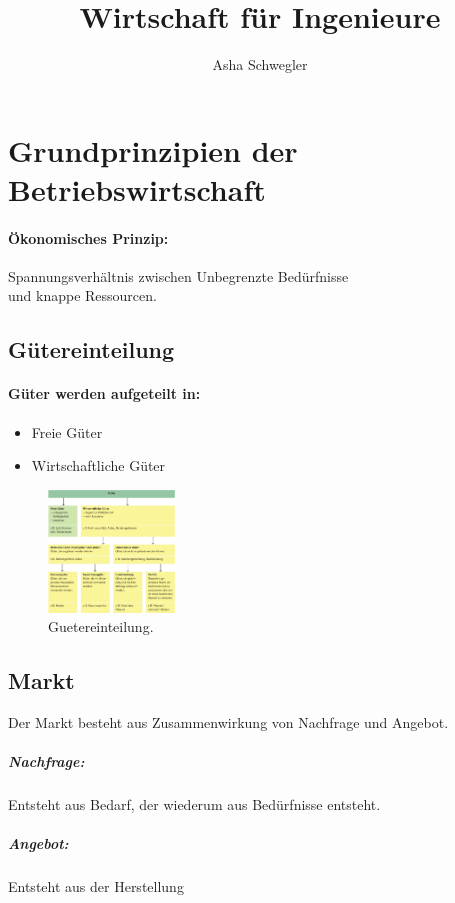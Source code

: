 \documentclass{article}
\title{Wirtschaft für Ingenieure}
\author{Asha Schwegler}
\begin{document}
\maketitle

\section{Grundprinzipien der Betriebswirtschaft}

\paragraph{Ökonomisches Prinzip:}
Spannungsverhältnis zwischen Unbegrenzte Bedürfnisse\\
und knappe Ressourcen.

\subsection{Gütereinteilung}
\paragraph{Güter werden aufgeteilt in:}

\begin{itemize}
\item Freie Güter
\item Wirtschaftliche Güter
\end{itemize}

\begin{figure}
\centering
\includegraphics[width=0.3\textwidth]{Resources/Image/Guetereinteilung.png}
\caption{\label{fig:Guetereinteilung}Guetereinteilung.}
\end{figure}


\subsection{Markt}
Der Markt besteht aus Zusammenwirkung von Nachfrage und Angebot. \\
\subparagraph{Nachfrage:} Entsteht aus Bedarf, der wiederum aus Bedürfnisse entsteht.
\subparagraph{Angebot:} 
Entsteht aus der Herstellung
\end{document}
